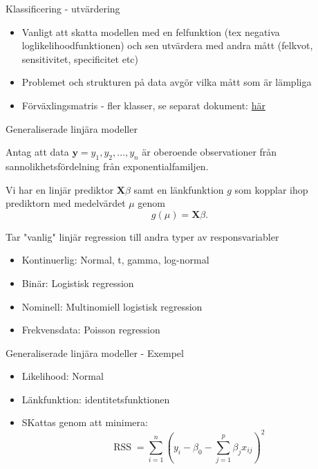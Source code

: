 \documentclass[10pt,english]{beamer}
\begin{document}
\begin{frame}{Klassificering - utvärdering}


\begin{itemize}
    \item Vanligt att skatta modellen med en felfunktion (tex negativa loglikelihoodfunktionen) och sen utvärdera med andra mått (felkvot, sensitivitet, specificitet etc)
    \item Problemet och strukturen på data avgör vilka mått som är lämpliga
    \item Förväxlingsmatris - fler klasser, se separat dokument: \href{https://raw.githubusercontent.com/STIMALiU/732G12_DM/master/other/confusion\%20matrix\%20classification\%20evaluation\%20metrics.pdf}{här}
\end{itemize}
    
\end{frame}



\begin{frame}{Generaliserade linjära modeller}

    Antag att data $\mathbf{y} = y_1, y_2, \ldots, y_n$ är oberoende observationer från sannolikhetsfördelning från exponentialfamiljen.

    Vi har en linjär prediktor $\mathbf{X} \beta$ samt en länkfunktion $g$ som kopplar ihop prediktorn med medelvärdet $\mu$ genom
    \begin{equation*}
        g(\mu) = \mathbf{X} \beta.
    \end{equation*}
    
    Tar "vanlig" linjär regression till andra typer av responsvariabler
    \begin{itemize}
        \item Kontinuerlig: Normal, t, gamma, log-normal
        \item Binär: Logistisk regression
        \item Nominell: Multinomiell logistisk regression
        \item Frekvensdata: Poisson regression
    \end{itemize}
\end{frame}

\begin{frame}{Generaliserade linjära modeller - Exempel}

    \begin{itemize}
        \item Likelihood: Normal
        \item L\"ankfunktion: identitetsfunktionen
        \item SKattas genom att minimera:
        \begin{equation*}
            \operatorname{RSS} = \sum_{i=1}^{n} \left( y_i - \beta_0 - \sum_{j=1}^{p} \beta_j x_{ij} \right)^2
        \end{equation*}
    \end{itemize}

\end{frame}
\end{document}
